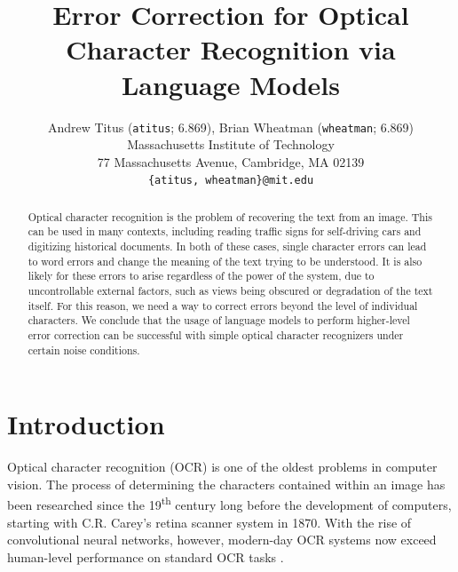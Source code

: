 \documentclass[10pt,twocolumn,letterpaper]{article}
\begin{document}
\title{Error Correction for Optical Character Recognition via Language Models}

\author{Andrew Titus (\texttt{atitus}; 6.869), Brian Wheatman (\texttt{wheatman}; 6.869)\\
Massachusetts Institute of Technology\\
77 Massachusetts Avenue, Cambridge, MA 02139\\
{\tt\small \{atitus, wheatman\}@mit.edu}
}

\maketitle

\begin{abstract}
Optical character recognition is the problem of recovering the text from an image.  This can be used in many contexts, including reading traffic signs for self-driving cars and digitizing historical documents.  In both of these cases, single character errors can lead to word errors and change the meaning of the text trying to be understood. It is also likely for these errors to arise regardless of the power of the system, due to uncontrollable external factors, such as views being obscured or degradation of the text itself. For this reason, we need a way to correct errors beyond the level of individual characters. We conclude that the usage of language models to perform higher-level error correction can be successful with simple optical character recognizers under certain noise conditions.
\end{abstract}

\section{Introduction}
\label{introduction}
Optical character recognition (OCR) is one of the oldest problems
in computer vision. The process of determining the characters
contained within an image has been researched since the
19\textsuperscript{th} century \cite{Eikvil93-OCR} long before the
development of computers, starting with C.R. Carey's retina
scanner system in 1870. With the rise of convolutional neural networks,
however, modern-day OCR systems now exceed human-level performance on
standard OCR tasks \cite{Chen15-BHR}.
\end{document}
